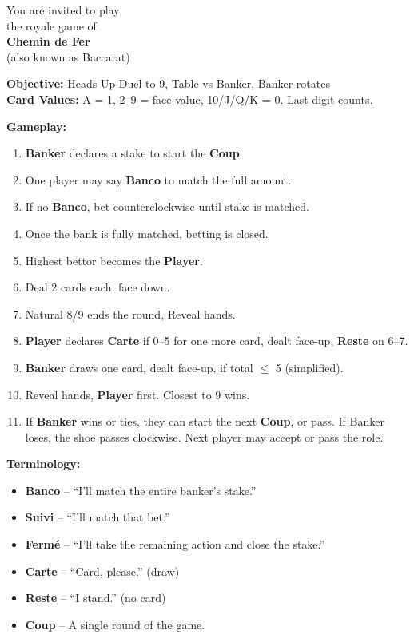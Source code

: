 \documentclass[11pt]{article}
\begin{document}
\vspace*{0.3in}

\begin{multicols}{2}
\begin{center}
    {\headingfont\fontsize{20}{24}\selectfont You are invited to play}\\[2pt]
    {\headingfont\fontsize{12}{14}\selectfont the royale game of}\\[2pt]
    {\headingfont\fontsize{22}{26}\selectfont \textbf{Chemin de Fer}}\\[4pt]
    {\headingfont\fontsize{8}{10}\selectfont (also known as Baccarat)}
\end{center}

\vspace{0.5in}

\textbf{Objective:} Heads Up Duel to 9, Table vs Banker, Banker rotates\\
\textbf{Card Values:} A = 1, 2–9 = face value, 10/J/Q/K = 0. Last digit counts.

\vspace{0.5em}
\textbf{Gameplay:}
\begin{enumerate}
\item \textbf{Banker} declares a stake to start the \textbf{Coup}.
\item One player may say \textbf{Banco} to match the full amount.
\item If no \textbf{Banco}, bet counterclockwise until stake is matched.
\item Once the bank is fully matched, betting is closed.
\item Highest bettor becomes the \textbf{Player}.
\item Deal 2 cards each, face down.
\item Natural 8/9 ends the round, Reveal hands.
\item \textbf{Player} declares \textbf{Carte} if 0–5 for one more card, dealt face-up, \textbf{Reste} on 6–7.
\item \textbf{Banker} draws one card, dealt face-up, if total $\leq$ 5 (simplified).
\item Reveal hands, \textbf{Player} first. Closest to 9 wins.
\item If \textbf{Banker} wins or ties, they can start the next
\textbf{Coup}, or pass. If Banker loses, the shoe passes clockwise.
Next player may accept or pass the role.
\end{enumerate}

\vspace{0.5em}
\textbf{Terminology:}
\begin{itemize}
\item \textbf{Banco} – “I’ll match the entire banker's stake.”
\item \textbf{Suivi} – “I’ll match that bet.”
\item \textbf{Fermé} – “I'll take the remaining action and close the stake.”
\item \textbf{Carte} – “Card, please.” (draw)
\item \textbf{Reste} – “I stand.” (no card)
\item \textbf{Coup} – A single round of the game.
\end{itemize}
\end{multicols}
\end{document}
